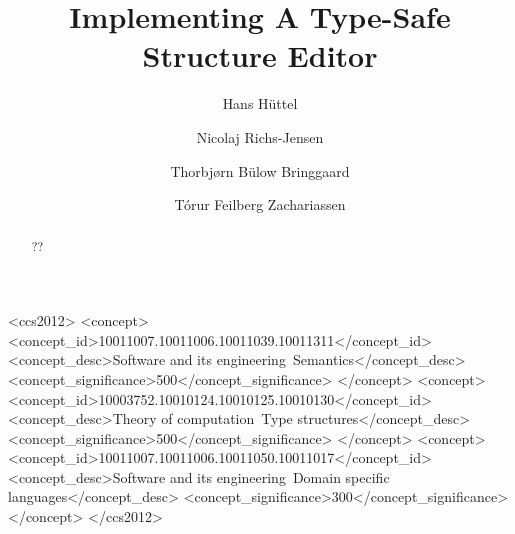 \documentclass[sigplan,screen]{acmart}
\begin{document}

%
\title{Implementing A Type-Safe Structure Editor}
%
%



\author{Hans Hüttel}

  
\author{Nicolaj Richs-Jensen}


\author{Thorbjørn Bülow Bringgaard}


\author{Tórur Feilberg Zachariassen}

  

%
%
%

%
 \begin{abstract}
??
\end{abstract}

\begin{CCSXML}
<ccs2012>
<concept>
<concept_id>10011007.10011006.10011039.10011311</concept_id>
<concept_desc>Software and its engineering~Semantics</concept_desc>
<concept_significance>500</concept_significance>
</concept>
<concept>
<concept_id>10003752.10010124.10010125.10010130</concept_id>
<concept_desc>Theory of computation~Type structures</concept_desc>
<concept_significance>500</concept_significance>
</concept>
<concept>
<concept_id>10011007.10011006.10011050.10011017</concept_id>
<concept_desc>Software and its engineering~Domain specific languages</concept_desc>
<concept_significance>300</concept_significance>
</concept>
</ccs2012>
\end{CCSXML}
\end{document}
